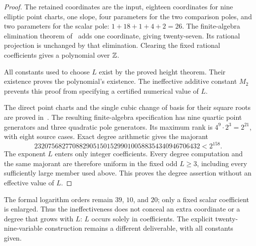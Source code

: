 \documentclass[11pt,a4paper]{article}
\begin{document}
\begin{proof}
The retained coordinates are the input, eighteen coordinates
for nine elliptic point charts, one slope, four parameters for
the two comparison poles, and two parameters for the scalar
pole: $1+18+1+4+2=26$. The finite-algebra elimination
theorem of~\cite{FiniteAlgebra} adds one coordinate, giving twenty-seven. Its rational
projection is unchanged by that elimination. Clearing the
fixed rational coefficients gives a polynomial over $\mathbb Z$.

All constants used to choose $L$ exist by the proved height
theorem. Their existence proves the polynomial's existence.
The ineffective additive constant $M_2$ prevents this proof
from specifying a certified numerical value of $L$.

The direct point charts and the single cubic change of basis
for their square roots are proved in~\cite{SquareCharts,QuadraticCharts}.
The resulting finite-algebra specification
\cite{FamilyCertificate} has nine quartic point generators
and three quadratic pole generators. Its maximum rank is
$4^9\cdot2^3=2^{21}$, with eight source cases. Exact degree
arithmetic gives the majorant
\[
 232075682770882905150152990100588354340946706432
                 <2^{158}.
\]
The exponent $L$ enters only integer coefficients. Every
degree computation and the same majorant are therefore
uniform in the fixed odd $L\ge3$, including every
sufficiently large member used above. This proves the degree
assertion without an effective value of $L$.
\end{proof}

The formal logarithm orders remain $39$, $10$, and $20$;
only a fixed scalar coefficient is enlarged. Thus the
ineffectiveness does not conceal an extra coordinate or a
degree that grows with $L$: $L$ occurs solely in coefficients.
The explicit twenty-nine-variable construction
remains a different deliverable, with all constants given.
\end{document}
